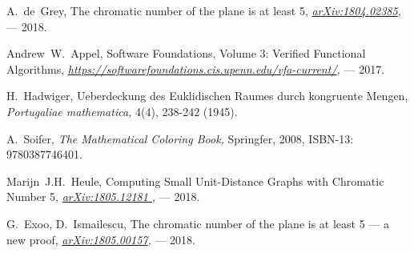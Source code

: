 \begin{thebibliography}{0}
    
    A.~de~Grey, 
    The chromatic number of the plane is at least 5, 
    {\it \href{arXiv:1804.02385}{arXiv:1804.02385}, }
    --- 2018. 
    
    Andrew~W.~Appel, 
    Software Foundations, Volume 3: Verified Functional Algorithms, 
    {\it \href{https://softwarefoundations.cis.upenn.edu/vfa-current/}{https://softwarefoundations.cis.upenn.edu/vfa-current/}, }
    --- 2017. 


    H.~Hadwiger,
    Ueberdeckung des Euklidischen Raumes durch kongruente Mengen,
    {\it Portugaliae mathematica,}
    4(4), 238-242 (1945).
    
    A.~Soifer,
    {\it The Mathematical Coloring Book,}
    Springfer, 2008, ISBN-13: 9780387746401.

    Marijn~J.H.~Heule,
    Computing Small Unit-Distance Graphs with Chromatic Number 5,
    {\it \href{ arXiv:1805.12181}{ arXiv:1805.12181 },} 
    --- 2018.
    
    G.~Exoo, D.~Ismailescu,
    The chromatic number of the plane is at least 5 --- a new proof,
    {\it \href{ arXiv:1805.00157}{ arXiv:1805.00157}, }
    --- 2018.
    

\end{thebibliography}